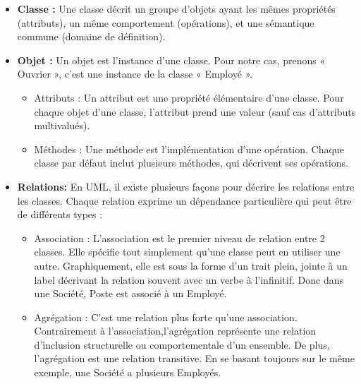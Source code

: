 \begin{itemize}
	
	
	\item \textbf{Classe :} 
    Une classe décrit un groupe d’objets ayant les mêmes propriétés (attributs), un même comportement (opérations), et une sémantique commune (domaine de définition).\\
    
	\item \textbf{Objet :} Un objet est l’instance d’une classe. Pour notre cas, prenons « Ouvrier », c’est une
	instance de la classe « Employé ».
	
    \begin{itemize}
		
	\item Attributs : Un attribut est une propriété élémentaire d’une classe. Pour chaque objet d’une classe, l’attribut prend une valeur (sauf cas d’attributs multivalués).
	
	\item Méthodes : Une méthode est l’implémentation d’une opération. Chaque classe par défaut inclut plusieurs méthodes, qui décrivent ses opérations.
    
    
   \end{itemize}
	
	\item \textbf{Relations:}
	En UML, il existe plusieurs façons pour décrire les relations entre les classes. Chaque relation exprime un dépendance particulière qui peut être de différents types :
	
	\begin{itemize}
		
	\item Association : L'association est le premier niveau de relation entre 2 classes. Elle spécifie tout simplement qu'une classe peut en utiliser une autre. Graphiquement, elle est sous la forme d’un trait plein, jointe à un label décrivant la relation souvent avec un verbe à l’infinitif. Donc dans une Société, Poste est associé à un Employé.
	
	
	\item Agrégation : C’est une relation plus forte qu’une association. Contrairement à l’association,l’agrégation représente une relation d’inclusion structurelle ou comportementale d’un ensemble. De plus, l’agrégation est une relation transitive. En se basant toujours sur le même exemple, une Société a plusieurs Employés.
	

\end{itemize}
\end{itemize}
